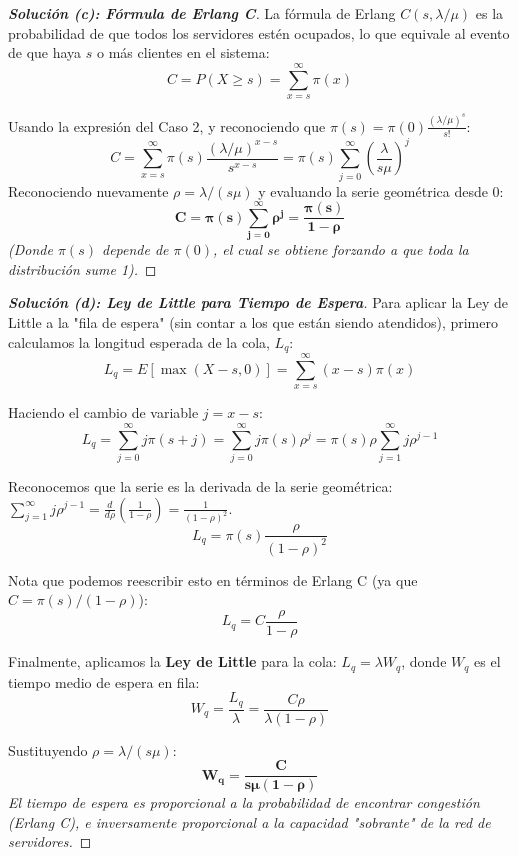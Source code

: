 \documentclass[10pt,a4paper]{article}
\begin{document}
\vspace{5mm}

\begin{proof}[\textbf{Solución (c): Fórmula de Erlang C}]
    La fórmula de Erlang $C(s, \lambda/\mu)$ es la probabilidad de que todos los servidores estén ocupados, lo que equivale al evento de que haya $s$ o más clientes en el sistema:
    \[ C = P(X \ge s) = \sum_{x=s}^\infty \pi(x) \]
    
    Usando la expresión del Caso 2, y reconociendo que $\pi(s) = \pi(0)\frac{(\lambda/\mu)^s}{s!}$:
    \[ C = \sum_{x=s}^\infty \pi(s) \frac{(\lambda/\mu)^{x-s}}{s^{x-s}} = \pi(s) \sum_{j=0}^\infty \left(\frac{\lambda}{s\mu}\right)^j \]
    Reconociendo nuevamente $\rho = \lambda/(s\mu)$ y evaluando la serie geométrica desde $0$:
    \[ \mathbf{C = \pi(s) \sum_{j=0}^\infty \rho^j = \frac{\pi(s)}{1 - \rho}} \]
    \textit{(Donde $\pi(s)$ depende de $\pi(0)$, el cual se obtiene forzando a que toda la distribución sume 1).}
\end{proof}

\vspace{5mm}

\begin{proof}[\textbf{Solución (d): Ley de Little para Tiempo de Espera}]
    Para aplicar la Ley de Little a la "fila de espera" (sin contar a los que están siendo atendidos), primero calculamos la longitud esperada de la cola, $L_q$:
    \[ L_q = E[\max(X - s, 0)] = \sum_{x=s}^\infty (x-s)\pi(x) \]
    
    Haciendo el cambio de variable $j = x-s$:
    \[ L_q = \sum_{j=0}^\infty j \pi(s+j) = \sum_{j=0}^\infty j \pi(s) \rho^j = \pi(s) \rho \sum_{j=1}^\infty j \rho^{j-1} \]
    
    Reconocemos que la serie es la derivada de la serie geométrica: $\sum_{j=1}^\infty j \rho^{j-1} = \frac{d}{d\rho} \left( \frac{1}{1-\rho} \right) = \frac{1}{(1-\rho)^2}$.
    \[ L_q = \pi(s) \frac{\rho}{(1-\rho)^2} \]
    
    Nota que podemos reescribir esto en términos de Erlang C (ya que $C = \pi(s)/(1-\rho)$):
    \[ L_q = C \frac{\rho}{1-\rho} \]
    
    Finalmente, aplicamos la \textbf{Ley de Little} para la cola: $L_q = \lambda W_q$, donde $W_q$ es el tiempo medio de espera en fila:
    \[ W_q = \frac{L_q}{\lambda} = \frac{C \rho}{\lambda(1-\rho)} \]
    
    Sustituyendo $\rho = \lambda/(s\mu)$:
    \[ \mathbf{W_q = \frac{C}{s\mu(1-\rho)}} \]
    \textit{El tiempo de espera es proporcional a la probabilidad de encontrar congestión (Erlang C), e inversamente proporcional a la capacidad "sobrante" de la red de servidores.}
\end{proof}
\end{document}
